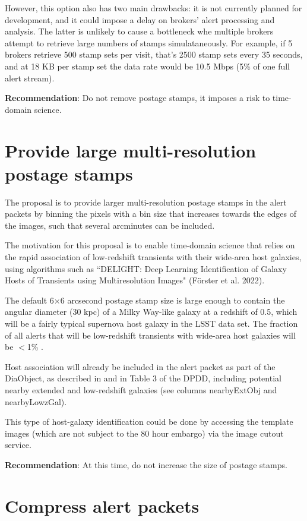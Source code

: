 \documentclass[DM,authoryear,toc]{lsstdoc}
\begin{document}
However, this option also has two main drawbacks: it is not currently planned for development, and it could impose a delay on brokers' alert processing and analysis.
The latter is unlikely to cause a bottleneck whe multiple brokers attempt to retrieve large numbers of stamps simulataneously.
For example, if 5 brokers retrieve 500 stamp sets per visit, that's 2500 stamp sets every 35 seconds, and at 18 KB per stamp set the data rate would be 10.5 Mbps (5\% of one full alert stream).

\textbf{Recommendation}: Do not remove postage stamps, it imposes a risk to time-domain science.


\section{Provide large multi-resolution postage stamps}\label{sec:bigstamps}

The proposal is to provide larger multi-resolution postage stamps in the alert packets by binning the pixels with a bin size that increases towards the edges of the images, such that several arcminutes can be included.

The motivation for this proposal is to enable time-domain science that relies on the rapid association of low-redshift transients with their wide-area host galaxies, using algorithms such as ``DELIGHT: Deep Learning Identification of Galaxy Hosts of Transients using Multiresolution Images" (Förster et al. 2022).

The default 6$\times$6 arcsecond postage stamp size is large enough to contain the angular diameter (30 kpc) of a Milky Way-like galaxy at a redshift of 0.5, which will be a fairly typical supernova host galaxy in the LSST data set.
The fraction of all alerts that will be low-redshift transients with wide-area host galaxies will be $<$1\% .

Host association will already be included in the alert packet as part of the DiaObject, as described in  and in Table 3 of the DPDD, including potential nearby extended and low-redshift galaxies (see columns nearbyExtObj and nearbyLowzGal).

This type of host-galaxy identification could be done by accessing the template images (which are not subject to the 80 hour embargo) via the image cutout service.

\textbf{Recommendation}: At this time, do not increase the size of postage stamps.


\section{Compress alert packets}\label{sec:compression}
\end{document}
